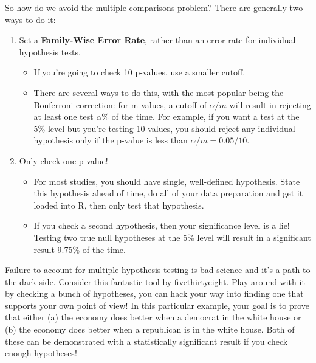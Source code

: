 \documentclass[
  letterpaper,
  DIV=11,
  numbers=noendperiod,
  oneside]{scrreprt}
\providecommand{\tightlist}{%
  \setlength{\itemsep}{0pt}\setlength{\parskip}{0pt}}\usepackage{longtable,booktabs,array}
\begin{document}
So how do we avoid the multiple comparisons problem? There are generally
two ways to do it:

\begin{enumerate}
\def\labelenumi{\arabic{enumi}.}
\tightlist
\item
  Set a \textbf{Family-Wise Error Rate}, rather than an error rate for
  individual hypothesis tests.

  \begin{itemize}
  \tightlist
  \item
    If you're going to check 10 p-values, use a smaller cutoff.
  \item
    There are several ways to do this, with the most popular being the
    Bonferroni correction: for m values, a cutoff of \(\alpha/m\) will
    result in rejecting at least one test \(\alpha\)\% of the time. For
    example, if you want a test at the 5\% level but you're testing 10
    values, you should reject any individual hypothesis only if the
    p-value is less than \(\alpha/m = 0.05/10\).
  \end{itemize}
\item
  Only check one p-value!

  \begin{itemize}
  \tightlist
  \item
    For most studies, you should have single, well-defined hypothesis.
    State this hypothesis ahead of time, do all of your data preparation
    and get it loaded into R, then only test that hypothesis.
  \item
    If you check a second hypothesis, then your significance level is a
    lie! Testing two true null hypotheses at the 5\% level will result
    in a significant result 9.75\% of the time.
  \end{itemize}
\end{enumerate}

Failure to account for multiple hypothesis testing is bad science and
it's a path to the dark side. Consider this fantastic tool by
\href{https://projects.fivethirtyeight.com/p-hacking/}{fivethirtyeight}.
Play around with it - by checking a bunch of hypotheses, you can hack
your way into finding one that supports your own point of view! In this
particular example, your goal is to prove that either (a) the economy
does better when a democrat in the white house or (b) the economy does
better when a republican is in the white house. Both of these can be
demonstrated with a statistically significant result if you check enough
hypotheses!
\end{document}
